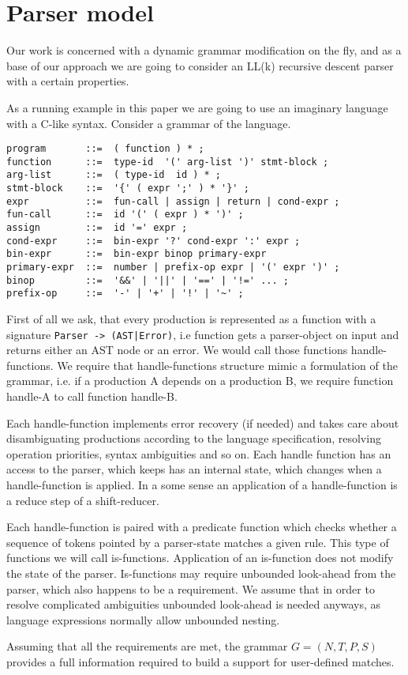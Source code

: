 \section{\label{sec:parser}Parser model}

Our work is concerned with a dynamic grammar modification on the
fly, and as a base of our approach we are going to consider an
LL(k) recursive descent parser with a certain properties.

As a running example in this paper we are going to use an imaginary
language with a C-like syntax.  Consider a grammar of the language.

\begin{verbatim}
program       ::=  ( function ) * ;
function      ::=  type-id  '(' arg-list ')' stmt-block ;
arg-list      ::=  ( type-id  id ) * ;
stmt-block    ::=  '{' ( expr ';' ) * '}' ;
expr          ::=  fun-call | assign | return | cond-expr ;
fun-call      ::=  id '(' ( expr ) * ')' ;
assign        ::=  id '=' expr ;
cond-expr     ::=  bin-expr '?' cond-expr ':' expr ;
bin-expr      ::=  bin-expr binop primary-expr
primary-expr  ::=  number | prefix-op expr | '(' expr ')' ;
binop         ::=  '&&' | '||' | '==' | '!=' ... ;
prefix-op     ::=  '-' | '+' | '!' | '~' ;
\end{verbatim}

First of all we ask, that every production is represented as a function
with a signature \verb/Parser -> (AST|Error)/, i.e function gets a
parser-object on input and returns either an AST node or an error.
We would call those functions handle-functions. We require that 
handle-functions structure mimic a formulation of the grammar,
i.e. if a production A depends on a production B, we require 
function handle-A to call function handle-B.

Each handle-function implements error recovery (if needed) and takes
care about disambiguating productions according to the language
specification, resolving operation priorities, syntax ambiguities
and so on.  Each handle function has an access to the parser, which
keeps has an internal state, which changes when a handle-function
is applied.  In a some sense an application of a handle-function
is a reduce step of a shift-reducer.

Each handle-function is paired with a predicate function which checks
whether a sequence of tokens pointed by a parser-state matches a 
given rule.  This type of functions we will call is-functions.
Application of an is-function does not modify the state of
the parser.  Is-functions may require unbounded look-ahead from 
the parser, which also happens to be a requirement.  We assume that in
order to resolve complicated ambiguities unbounded look-ahead is needed
anyways, as language expressions normally allow unbounded nesting.


Assuming that all the requirements are met, the grammar $G = (N, T, P,
S)$ provides a full information required to build a support for
user-defined matches.

